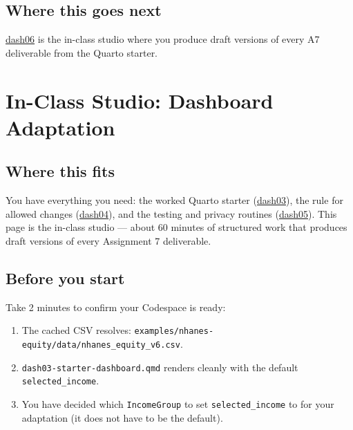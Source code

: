 \documentclass[
  letterpaper,
  DIV=11,
  numbers=noendperiod,
  oneside]{scrreprt}
\providecommand{\tightlist}{%
  \setlength{\itemsep}{0pt}\setlength{\parskip}{0pt}}
\begin{document}
\section*{Where this goes next}\label{where-this-goes-next-18}


\href{dash06-studio-dashboard-adaptation.qmd}{dash06} is the in-class
studio where you produce draft versions of every A7 deliverable from the
Quarto starter.

\chapter*{In-Class Studio: Dashboard
Adaptation}\label{in-class-studio-dashboard-adaptation}


\section*{Where this fits}\label{where-this-fits-16}


You have everything you need: the worked Quarto starter
(\hyperref[starter-dashboard]{dash03}), the rule for allowed changes
(\hyperref[audience-facing-text-what-you-can-and-cannot-change-for-a7]{dash04}),
and the testing and privacy routines
(\hyperref[testing-privacy-safe-publishing-and-the-shiny-demo]{dash05}).
This page is the in-class studio --- about 60 minutes of structured work
that produces draft versions of every Assignment 7 deliverable.

\section*{Before you start}\label{before-you-start-2}


Take 2 minutes to confirm your Codespace is ready:

\begin{enumerate}
\def\labelenumi{\arabic{enumi}.}
\tightlist
\item
  The cached CSV resolves:
  \texttt{examples/nhanes-equity/data/nhanes\_equity\_v6.csv}.
\item
  \texttt{dash03-starter-dashboard.qmd} renders cleanly with the default
  \texttt{selected\_income}.
\item
  You have decided which \texttt{IncomeGroup} to set
  \texttt{selected\_income} to for your adaptation (it does not have to
  be the default).
\end{enumerate}
\end{document}
